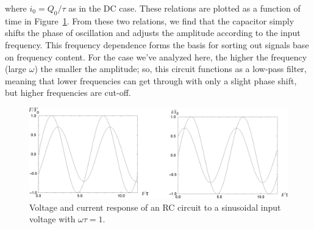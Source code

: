 where $i_0=Q_0/\tau$ as in the DC case. These relations are plotted as a 
function of time in Figure~\ref{fig:RC:oscillatingiv}. From these two 
relations, we find that the capacitor simply shifts the phase of oscillation 
and adjusts the amplitude according to the input frequency. This frequency
dependence forms the basis for sorting out signals base on frequency content. 
For the case we've analyzed here, the higher the frequency (large $\omega$) the
smaller the amplitude; so, this circuit functions as a low-pass filter, meaning
that lower frequencies can get through with only a slight phase shift, but 
higher frequencies are cut-off. 
\begin{figure}[htb]
\centering 
\epsfxsize=8cm \includegraphics[scale=0.4]{5_rccircuits/sineviout.eps}
\caption{Voltage and current response of an RC circuit to a sinusoidal
input voltage with $\omega \tau = 1$.}
\label{fig:RC:oscillatingiv}
\end{figure}

